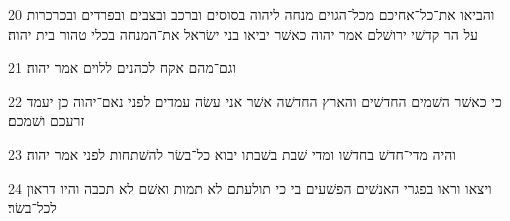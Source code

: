 \par 20 והביאו את־כל־אחיכם מכל־הגוים מנחה ליהוה בסוסים וברכב ובצבים ובפרדים ובכרכרות על הר קדשׁי ירושׁלם אמר יהוה כאשׁר יביאו בני ישׂראל את־המנחה בכלי טהור בית יהוה׃
\par 21 וגם־מהם אקח לכהנים ללוים אמר יהוה׃
\par 22 כי כאשׁר השׁמים החדשׁים והארץ החדשׁה אשׁר אני עשׂה עמדים לפני נאם־יהוה כן יעמד זרעכם ושׁמכם׃
\par 23 והיה מדי־חדשׁ בחדשׁו ומדי שׁבת בשׁבתו יבוא כל־בשׂר להשׁתחות לפני אמר יהוה׃
\par 24 ויצאו וראו בפגרי האנשׁים הפשׁעים בי כי תולעתם לא תמות ואשׁם לא תכבה והיו דראון לכל־בשׂר׃


